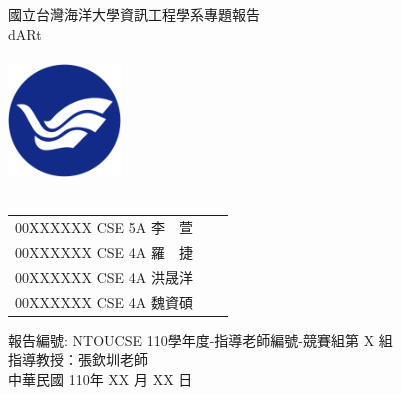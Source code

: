 \documentclass[12pt, a4paper]{report}
\begin{document}
\begin{titlepage}
    \linespread{2} %
    \centering
    \Large 國立台灣海洋大學資訊工程學系專題報告\\
    \LARGE dARt \\
    \ \\
    \includegraphics[width=3cm]{NTOU-school-badge}\\
    \ \\
    \linespread{1}
    \begin{table}[h]
        \large
        \centering
        \begin{tabular}{lll}
            00XXXXXX CSE 5A 李　萱 \\
            00XXXXXX CSE 4A 羅　捷 \\
            00XXXXXX CSE 4A 洪晟洋 \\
            00XXXXXX CSE 4A 魏資碩 \\
        \end{tabular}
    \end{table}

    \large 報告編號: NTOUCSE 110學年度-指導老師編號-競賽組第 X 組 \\
    \large 指導教授：張欽圳老師\ \\
    \vspace{3cm}
    \large 中華民國 110年 XX 月 XX 日

\end{titlepage}

\tableofcontents %






\end{document}

